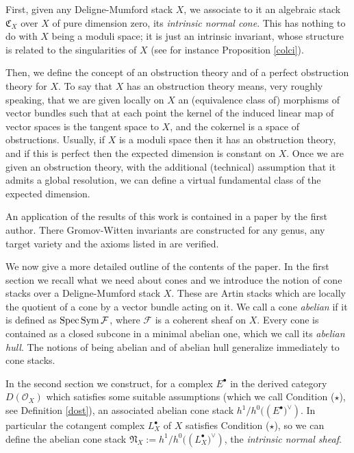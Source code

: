 \documentclass[11pt]{article}
\theoremstyle{plain}
\theoremstyle{definition}
\newcommand{\dual}[1]{{{#1}^{\vee}}}
\newcommand{\com}{^{\scriptscriptstyle\bullet}}
\newcommand{\NN}{{\mathfrak{N}}}
\newcommand{\CC}{{\mathfrak{C}}}
\renewcommand{\O}{{\mathcal{O}}}
\newcommand{\fF}{{\mathcal{F}}}
\newcommand{\spec}{\mathop{\rm Spec}\nolimits}
\newcommand{\Sym}{\mathop{\rm Sym}\nolimits}
\theoremstyle{plain}
\theoremstyle{definition}
\theoremstyle{remark}
\begin{document}
First, given any Deligne-Mumford stack \(X\), we associate to it an
algebraic stack \(\CC_X\) over \(X\) of pure dimension zero, its {\em
intrinsic normal cone}. This has nothing to do with \(X\) being a moduli
space; it is just an intrinsic invariant, whose structure is related
to the singularities of \(X\) (see for instance Proposition
\ref{colci}).

Then, we define the concept of an obstruction theory and of a perfect
obstruction theory for \(X\). To say that \(X\) has an obstruction theory
means, very roughly speaking, that we are given locally on \(X\) an
(equivalence class of) morphisms of vector bundles such that at each
point the kernel of the induced linear map of vector spaces is the
tangent space to \(X\), and the cokernel is a space of
obstructions. Usually, if \(X\) is a moduli space then it has an
obstruction theory, and if this is perfect then the expected dimension
is constant on \(X\).  Once we are given an obstruction theory, with the
additional (technical) assumption that it admits a global resolution,
we can define a virtual fundamental class of the expected dimension.

An application of the results of this work is contained in a paper
\cite{gwi} by the first author. There Gromov-Witten invariants are
constructed for any genus, any target variety and the axioms listed in
\cite{BM} are verified.

We now give a more detailed outline of the contents of the paper. In
the first section we recall what we need about cones and we introduce
the notion of cone stacks over a Deligne-Mumford stack \(X\). These are
Artin stacks which are locally the quotient of a cone by a vector
bundle acting on it. We call a cone {\em abelian }if it is defined as
\(\spec\Sym \fF\), where \(\fF\) is a coherent sheaf on \(X\). Every cone is
contained as a closed subcone in a minimal abelian one, which we call
its {\em abelian hull}. The notions of being abelian and of abelian hull
generalize immediately to cone stacks.

In the second section we
construct, for a complex \(E\com\) in the derived category \(D(\O_X)\)
which satisfies some suitable assumptions (which we call Condition
(\(\star\)), see Definition \ref{dost}), an associated abelian cone
stack \(h^1/h^0((E\com\dual))\). In particular the cotangent complex
\(L_X\com\) of \(X\) satisfies Condition (\(\star\)), so we can define the
abelian cone stack \(\NN_X:=h^1/h^0((L_X\com\dual))\), the {\em
intrinsic normal sheaf}.
\end{document}
